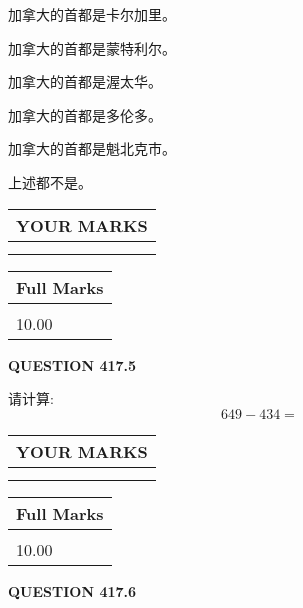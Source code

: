 \documentclass{ctexart}
\begin{document}
  
 
 
加拿大的首都是卡尔加里。
 
 
加拿大的首都是蒙特利尔。
 
 
加拿大的首都是渥太华。
 
 
加拿大的首都是多伦多。
 
 
加拿大的首都是魁北克市。
 
 
 上述都不是。
 
 
  
\vspace{0.2in}
  
\noindent\begin{tabular}{|l|}
\hline
 YOUR MARKS  \\
\hline
 \\ 
 \\ 
\hline
\end{tabular}
\hspace{0.05in} \begin{tabular}{|l|}
\hline
 Full Marks  \\
\hline
 \\ 
10.00 \\
\hline
\end{tabular}
{\textbf{\Large{QUESTION
417.5 
}}}
  
  
 
请计算:
\begin{equation}
649 -   %
434 = \nonumber
\end{equation}
 

 

 
  
\vspace{0.2in}
  
\noindent\begin{tabular}{|l|}
\hline
 YOUR MARKS  \\
\hline
 \\ 
 \\ 
\hline
\end{tabular}
\hspace{0.05in} \begin{tabular}{|l|}
\hline
 Full Marks  \\
\hline
 \\ 
10.00 \\
\hline
\end{tabular}
{\textbf{\Large{QUESTION
417.6 
}}}
  
\end{document}
